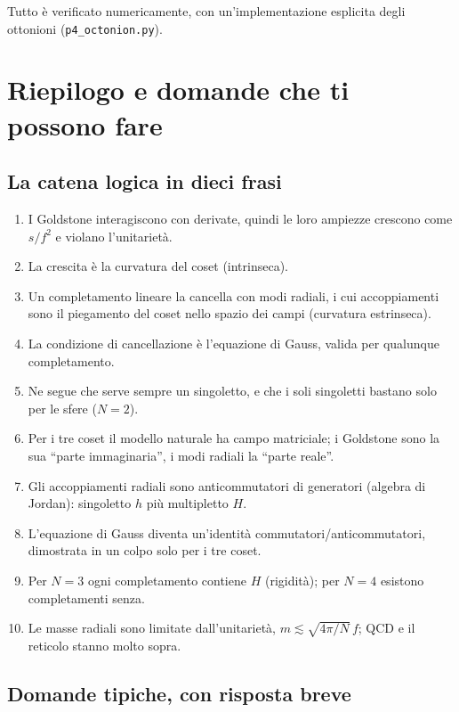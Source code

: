 \documentclass[11pt,a4paper]{article}
\numberwithin{equation}{section}
\theoremstyle{remark}
\begin{document}
Tutto è verificato numericamente, con un'implementazione esplicita degli ottonioni (\texttt{p4\_octonion.py}).

\section{Riepilogo e domande che ti possono fare}

\subsection{La catena logica in dieci frasi}

\begin{enumerate}
\item I Goldstone interagiscono con derivate, quindi le loro ampiezze crescono come $s/f^2$ e violano l'unitarietà.
\item La crescita è la curvatura del coset (intrinseca).
\item Un completamento lineare la cancella con modi radiali, i cui accoppiamenti sono il piegamento del coset nello spazio dei campi (curvatura estrinseca).
\item La condizione di cancellazione è l'equazione di Gauss, valida per qualunque completamento.
\item Ne segue che serve sempre un singoletto, e che i soli singoletti bastano solo per le sfere ($N=2$).
\item Per i tre coset il modello naturale ha campo matriciale; i Goldstone sono la sua ``parte immaginaria'', i modi radiali la ``parte reale''.
\item Gli accoppiamenti radiali sono anticommutatori di generatori (algebra di Jordan): singoletto $h$ più multipletto $H$.
\item L'equazione di Gauss diventa un'identità commutatori/anticommutatori, dimostrata in un colpo solo per i tre coset.
\item Per $N=3$ ogni completamento contiene $H$ (rigidità); per $N=4$ esistono completamenti senza.
\item Le masse radiali sono limitate dall'unitarietà, $m\lesssim\sqrt{4\pi/N}\,f$; QCD e il reticolo stanno molto sopra.
\end{enumerate}

\subsection{Domande tipiche, con risposta breve}
\end{document}
